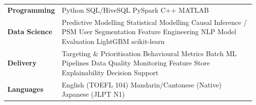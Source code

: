 \documentclass[a4paper,10pt]{article}
\begin{document}
\begin{tabular}{@{}p{2.5cm}p{14.7cm}@{}}
\textbf{Programming} & Python \textperiodcentered{} SQL/HiveSQL \textperiodcentered{} PySpark \textperiodcentered{} C++ \textperiodcentered{} MATLAB \\[1pt]
\textbf{Data Science} & Predictive Modelling \textperiodcentered{} Statistical Modelling \textperiodcentered{} Causal Inference / PSM \textperiodcentered{} User Segmentation \textperiodcentered{} Feature Engineering \textperiodcentered{} NLP \textperiodcentered{} Model Evaluation \textperiodcentered{} LightGBM \textperiodcentered{} scikit-learn \\[1pt]
\textbf{Delivery} & Targeting \& Prioritisation \textperiodcentered{} Behavioural Metrics \textperiodcentered{} Batch ML Pipelines \textperiodcentered{} Data Quality \textperiodcentered{} Monitoring \textperiodcentered{} Feature Store \textperiodcentered{} Explainability \textperiodcentered{} Decision Support \\[1pt]
\textbf{Languages} & English (TOEFL 104) \textperiodcentered{} Mandarin/Cantonese (Native) \textperiodcentered{} Japanese (JLPT N1) \\
\end{tabular}
\end{document}

